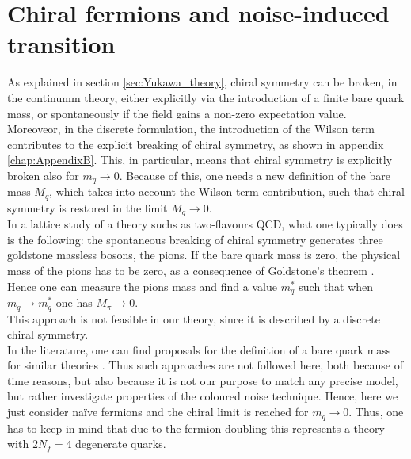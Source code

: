 \section{Chiral fermions and noise-induced transition}
\label{sec:chiral_PT}
As explained in section \ref{sec:Yukawa_theory}, chiral symmetry can be broken, in the continumm theory, either explicitly via the introduction of a finite bare quark mass, or spontaneously if the field gains a non-zero expectation value.\\
Moreoveor, in the discrete formulation, the introduction of the Wilson term contributes to the explicit breaking of chiral symmetry, as shown in appendix \ref{chap:AppendixB}. This, in particular, means that chiral symmetry is explicitly broken also for $m_q \to 0$. Because of this, one needs a new definition of the bare mass $M_q$, which takes into account the Wilson term contribution, such that chiral symmetry is restored in the limit $M_q \to 0$. \\
In a lattice study of a theory suchs as  two-flavours QCD, what one typically does \cite{rothe_LGT,gattringer_LQCD} is the following: the spontaneous breaking of chiral symmetry generates three goldstone massless bosons, the pions. If the bare quark mass is zero, the physical mass of the pions has to be zero, as a consequence of Goldstone's theorem \cite{goldstone}. Hence one can measure the pions mass and find a value $m_q^*$ such that when $m_q \to m_q^*$ one has $M_\pi \to 0$. \\
This approach is not feasible in our theory, since it is described by a discrete chiral symmetry. \\
In the literature, one can find proposals for the definition of a bare quark mass for similar theories \cite{Iwasaki:1994gq,MAIANI1986265}. Thus such approaches are not followed here, both because of time reasons, but also because it is not our purpose to match any precise model, but rather investigate properties of the coloured noise technique. Hence, here we just consider na\"ive fermions and the chiral limit is reached for $m_q \to 0$. Thus, one has to keep in mind that due to the fermion doubling this represents a theory with $2N_f = 4$ degenerate quarks. \\~\\

